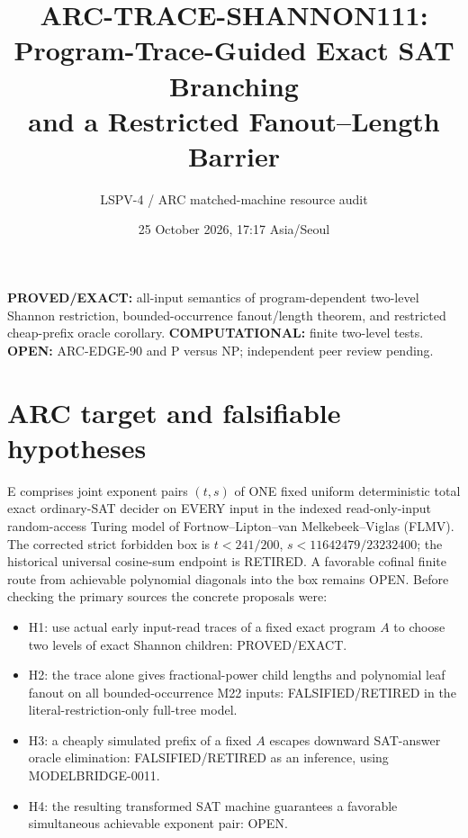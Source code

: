 \documentclass[11pt]{article}
\title{ARC-TRACE-SHANNON111: Program-Trace-Guided Exact SAT Branching\\and a Restricted Fanout--Length Barrier}
\author{LSPV-4 / ARC matched-machine resource audit}
\date{25 October 2026, 17:17 Asia/Seoul}
\begin{document}
\maketitle
\noindent\textbf{PROVED/EXACT:} all-input semantics of program-dependent two-level Shannon restriction, bounded-occurrence fanout/length theorem, and restricted cheap-prefix oracle corollary. \textbf{COMPUTATIONAL:} finite two-level tests. \textbf{OPEN:} ARC-EDGE-90 and P versus NP; independent peer review pending.

\section{ARC target and falsifiable hypotheses}
E comprises joint exponent pairs $(t,s)$ of ONE fixed uniform deterministic total exact ordinary-SAT decider on EVERY input in the indexed read-only-input random-access Turing model of Fortnow--Lipton--van Melkebeek--Viglas (FLMV). The corrected strict forbidden box is $t<241/200$, $s<11642479/23232400$; the historical universal cosine-sum endpoint is RETIRED. A favorable cofinal finite route from achievable polynomial diagonals into the box remains OPEN.
Before checking the primary sources the concrete proposals were:
\begin{itemize}
\item[] H1: use actual early input-read traces of a fixed exact program $A$ to choose two levels of exact Shannon children: PROVED/EXACT.
\item[] H2: the trace alone gives fractional-power child lengths and polynomial leaf fanout on all bounded-occurrence M22 inputs: FALSIFIED/RETIRED in the literal-restriction-only full-tree model.
\item[] H3: a cheaply simulated prefix of a fixed $A$ escapes downward SAT-answer oracle elimination: FALSIFIED/RETIRED as an inference, using MODELBRIDGE-0011.
\item[] H4: the resulting transformed SAT machine guarantees a favorable simultaneous achievable exponent pair: OPEN.
\end{itemize}
\end{document}
